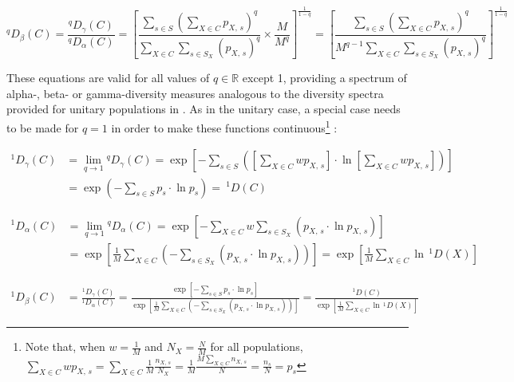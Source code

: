\begin{equation}
^qD_\beta(C) = \frac{^qD_\gamma(C)}{^qD_\alpha(C)}
= \left[
\frac{\displaystyle\sum_{s \in S}\left(\sum_{X \in C} p_{X,\,s}\right)^q}{\displaystyle \sum_{X \in C}\sum_{s \in S_X} (p_{X,\,s})^q}
\times
\frac{\displaystyle M}{\displaystyle M^q}
\right]^\frac{1}{1-q}
= \left[
\frac{\displaystyle\sum_{s \in S}\left(\sum_{X \in C} p_{X,\,s}\right)^q}{\displaystyle M^{q-1} \sum_{X \in C}\sum_{s \in S_X} (p_{X,\,s})^q}
\right]^\frac{1}{1-q}
\label{eq:diversity_beta_even}
\end{equation}

\noindent These equations are valid for all values of $q \in \mathbb{R}$ except 1, providing a spectrum of alpha-, beta- or gamma-diversity measures analogous to the diversity spectra provided for unitary populations in . As in the unitary case, a special case needs to be made for $q = 1$ in order to make these functions continuous\footnote{Note that, when $w = \frac{1}{M}$ and $N_X = \frac{N}{M}$ for all populations, $\displaystyle\sum_{X \in C}wp_{X,\,s} = \sum_{X \in C}\frac{1}{M}\frac{n_{X,\,s}}{N_X} = \frac{1}{M}\frac{M \sum_{X \in C} n_{X,\,s}}{N} = \frac{n_{s}}{N} = p_s$} \parencite{jost2007partitioning}:

\begin{equation}
\begin{split}
^1D_\gamma(C) & = \lim_{q \to 1} {^qD}_\gamma(C)
= \exp\left[-\sum_{s \in S}\left(\left[\sum_{X \in C}wp_{X,\,s}\right]\cdot\ln \left[\sum_{X \in C}wp_{X,\,s}\right]\right)\right]\\
& = \exp\left(-\sum_{s \in S}p_s \cdot\ln p_s\right) =\:^1D(C)
\end{split}
\label{eq:diversity_gamma_q1}
\end{equation}

\begin{equation}
\begin{split}
^1D_\alpha(C) & = \lim_{q \to 1} {^qD}_\alpha(C)
= \exp\left[-\sum_{X \in C}w\sum_{s \in S_X}(p_{X,\,s}\cdot\ln p_{X,\,s})\right]\\
 & = \exp\left[\frac{1}{M}\sum_{X \in C}\left(-\sum_{s \in S_X}(p_{X,\,s}\cdot\ln p_{X,\,s})\right)\right] = \exp\left[\frac{1}{M}\sum_{X \in C}\ln\,^1D(X)\right]
\end{split}
\label{eq:diversity_alpha_q1}
\end{equation}

\begin{equation}
\begin{split}
^1D_\beta(C) & = \frac{^1D_\gamma(C)}{^1D_\alpha(C)} = \frac{\exp\left[-\sum_{s \in S}p_s \cdot\ln p_s\right]}{\exp\left[\frac{1}{M}\sum_{X \in C}\left(-\sum_{s \in S_X}(p_{X,\,s}\cdot\ln p_{X,\,s})\right)\right]} = \frac{^1D(C)}{\exp\left[\frac{1}{M}\sum_{X \in C}\ln\,^1D(X)\right]}
\end{split}
\label{eq:diversity_beta_q1}
\end{equation}

